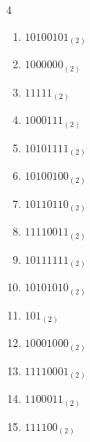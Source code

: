 \begin{multicols}{4}
\begin{enumerate}
        \phantom{$=204$}

  \item $10100101_{(2)}$

        \phantom{$=165$}

\columnbreak %

\resetques

  \item $1000000_{(2)}$

        \phantom{$=64$}

  \item $11111_{(2)}$

        \phantom{$=31$}

  \item $1000111_{(2)}$

        \phantom{$=71$}

  \item $10101111_{(2)}$

        \phantom{$=175$}

  \item $10100100_{(2)}$

        \phantom{$=164$}

  \item $10110110_{(2)}$

        \phantom{$=182$}

  \item $11110011_{(2)}$

        \phantom{$=243$}

  \item $10111111_{(2)}$

        \phantom{$=191$}

  \item $10101010_{(2)}$

        \phantom{$=170$}

  \item $101_{(2)}$

        \phantom{$=5$}

  \item $10001000_{(2)}$

        \phantom{$=136$}

  \item $11110001_{(2)}$

        \phantom{$=241$}

  \item $1100011_{(2)}$

        \phantom{$=99$}

  \item $111100_{(2)}$


\end{enumerate}
\end{multicols}
